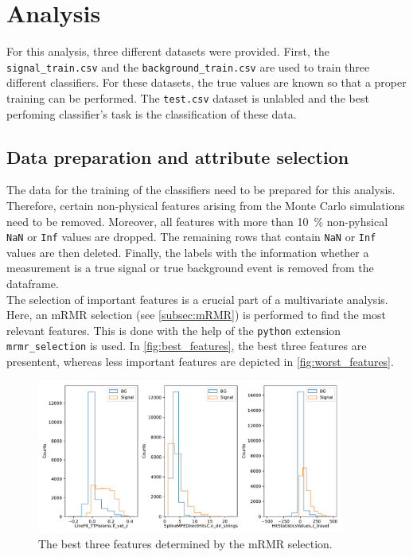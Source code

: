 \section{Analysis}
\label{sec:Analysis}
For this analysis, three different datasets were provided. First, the \texttt{signal\_train.csv} and the \texttt{background\_train.csv} are used to train three different classifiers. For these datasets,
the true values are known so that a proper training can be performed. The \texttt{test.csv} dataset is unlabled and the best perfoming classifier's task is the classification of these data.

\subsection{Data preparation and attribute selection}
The data for the training of the classifiers need to be prepared for this analysis. Therefore, certain non-physical features arising from the Monte Carlo simulations need to be removed. Moreover, all 
features with more than \qty{10}{\percent} non-pyhsical \texttt{NaN} or \texttt{Inf} values are dropped. The remaining rows that contain \texttt{NaN} or \texttt{Inf} values are then deleted. Finally, the
labels with the information whether a measurement is a true signal or true background event is removed from the dataframe. \\
The selection of important features is a crucial part of a multivariate analysis. Here, an mRMR selection (see \autoref{subsec:mRMR}) is performed to find the most relevant features. This is done with the help of the \texttt{python}
extension \texttt{mrmr\_selection} \cite{mrmr} is used. In \autoref{fig:best_features}, the best three features are presentent, whereas less important features are depicted in \autoref{fig:worst_features}.
\begin{figure}
    \centering
    \includegraphics[width=0.9\textwidth]{content/plots/best_3_features.pdf}
    \caption{The best three features determined by the mRMR selection.}
    \label{fig:best_features}
\end{figure}

